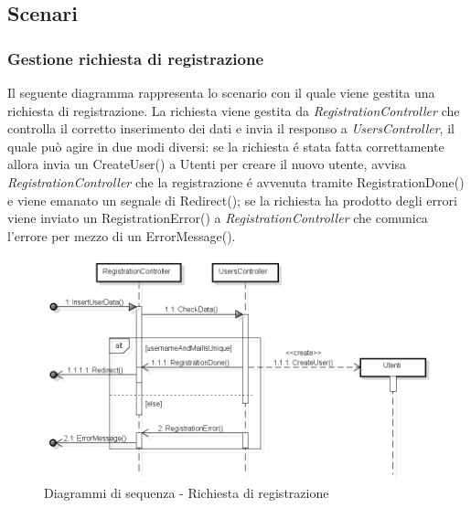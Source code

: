 \subsection{Scenari}
\subsubsection{Gestione richiesta di registrazione}
Il seguente diagramma rappresenta lo scenario con il quale viene gestita una richiesta di registrazione. La richiesta viene gestita da \textit{RegistrationController} che controlla il corretto inserimento dei dati e invia il responso a \textit{UsersController}, il quale può agire in due modi diversi: se la richiesta é stata fatta correttamente allora invia un CreateUser() a Utenti per creare il nuovo utente, avvisa \textit{RegistrationController} che la registrazione é avvenuta tramite RegistrationDone() e viene emanato un segnale di Redirect(); se la richiesta ha prodotto degli errori viene inviato un RegistrationError() a \textit{RegistrationController} che comunica l'errore per mezzo di un ErrorMessage().
\begin{figure}[H]
	\centering
	\includegraphics[scale=0.5]{img/register.png}
	\caption{Diagrammi di sequenza - Richiesta di registrazione}
\end{figure}

